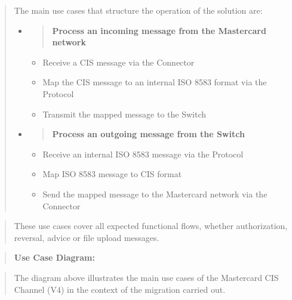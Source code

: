\documentclass[12pt,a4paper]{report}
\begin{document}
\begin{quote}
The main use cases that structure the operation of the solution are:
\begin{itemize}
\item
  \begin{quote}
  \textbf{Process an incoming message from the Mastercard network}
  \end{quote}

  \begin{itemize}
  \item
    Receive a CIS message via the Connector
  \item
    Map the CIS message to an internal ISO 8583 format via the Protocol
  \item
    Transmit the mapped message to the Switch
  \end{itemize}
\end{itemize}

\begin{itemize}
\item
  \begin{quote}
  \textbf{Process an outgoing message from the Switch}
  \end{quote}

  \begin{itemize}
  \item
    Receive an internal ISO 8583 message via the Protocol
  \item
    Map ISO 8583 message to CIS format
  \item
    Send the mapped message to the Mastercard network via the Connector
  \end{itemize}
\end{itemize}
\end{quote}



\begin{quote}
These use cases cover all expected functional flows, whether
authorization, reversal, advice or file upload messages.
\end{quote}

\begin{quote}
    \textbf{Use Case Diagram:}
\end{quote}

\begin{quote}
The diagram above illustrates the main use cases of the Mastercard CIS
Channel (V4) in the context of the migration carried out.
\end{quote}
\end{document}
